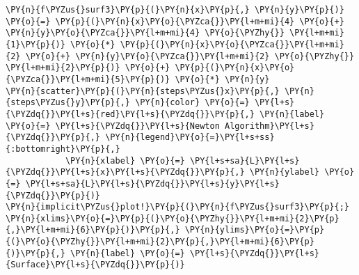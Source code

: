     \begin{tcolorbox}[breakable, size=fbox, boxrule=1pt, pad at break*=1mm,colback=cellbackground, colframe=cellborder]
\begin{Verbatim}[commandchars=\\\{\}]
\PY{n}{f\PYZus{}surf3}\PY{p}{(}\PY{n}{x}\PY{p}{,} \PY{n}{y}\PY{p}{)} \PY{o}{=} \PY{p}{(}\PY{n}{x}\PY{o}{\PYZca{}}\PY{l+m+mi}{4} \PY{o}{+} \PY{n}{y}\PY{o}{\PYZca{}}\PY{l+m+mi}{4} \PY{o}{\PYZhy{}} \PY{l+m+mi}{1}\PY{p}{)} \PY{o}{*} \PY{p}{(}\PY{n}{x}\PY{o}{\PYZca{}}\PY{l+m+mi}{2} \PY{o}{+} \PY{n}{y}\PY{o}{\PYZca{}}\PY{l+m+mi}{2} \PY{o}{\PYZhy{}} \PY{l+m+mi}{2}\PY{p}{)} \PY{o}{+} \PY{p}{(}\PY{n}{x}\PY{o}{\PYZca{}}\PY{l+m+mi}{5}\PY{p}{)} \PY{o}{*} \PY{n}{y}
\PY{n}{scatter}\PY{p}{(}\PY{n}{steps\PYZus{}x}\PY{p}{,} \PY{n}{steps\PYZus{}y}\PY{p}{,} \PY{n}{color} \PY{o}{=} \PY{l+s}{\PYZdq{}}\PY{l+s}{red}\PY{l+s}{\PYZdq{}}\PY{p}{,} \PY{n}{label} \PY{o}{=} \PY{l+s}{\PYZdq{}}\PY{l+s}{Newton Algorithm}\PY{l+s}{\PYZdq{}}\PY{p}{,} \PY{n}{legend}\PY{o}{=}\PY{l+s+ss}{:bottomright}\PY{p}{,} 
            \PY{n}{xlabel} \PY{o}{=} \PY{l+s+sa}{L}\PY{l+s}{\PYZdq{}}\PY{l+s}{x}\PY{l+s}{\PYZdq{}}\PY{p}{,} \PY{n}{ylabel} \PY{o}{=} \PY{l+s+sa}{L}\PY{l+s}{\PYZdq{}}\PY{l+s}{y}\PY{l+s}{\PYZdq{}}\PY{p}{)}
\PY{n}{implicit\PYZus{}plot!}\PY{p}{(}\PY{n}{f\PYZus{}surf3}\PY{p}{;} \PY{n}{xlims}\PY{o}{=}\PY{p}{(}\PY{o}{\PYZhy{}}\PY{l+m+mi}{2}\PY{p}{,}\PY{l+m+mi}{6}\PY{p}{)}\PY{p}{,} \PY{n}{ylims}\PY{o}{=}\PY{p}{(}\PY{o}{\PYZhy{}}\PY{l+m+mi}{2}\PY{p}{,}\PY{l+m+mi}{6}\PY{p}{)}\PY{p}{,} \PY{n}{label} \PY{o}{=} \PY{l+s}{\PYZdq{}}\PY{l+s}{Surface}\PY{l+s}{\PYZdq{}}\PY{p}{)}
\end{Verbatim}
\end{tcolorbox}
 
            
    
    \begin{center}
    \end{center}
    { \hspace*{\fill} \\}